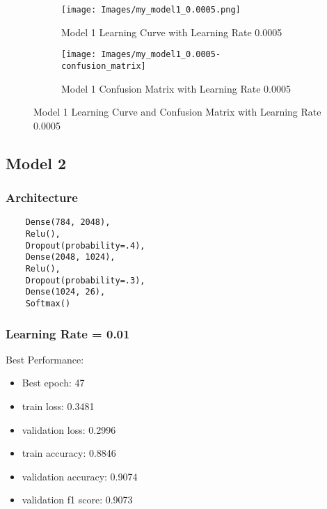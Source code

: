 \documentclass{article}
\begin{document}
\begin{figure}[h]
    \begin{subfigure}{0.5\textwidth}
        \texttt{[image: Images/my\_model1\_0.0005.png]} 
        \caption{Model 1 Learning Curve with Learning Rate 0.0005}
        \label{fig:model1_lr_0.0005}
    \end{subfigure}
    \begin{subfigure}{0.5\textwidth}
        \texttt{[image: Images/my\_model1\_0.0005-confusion\_matrix]} 
        \caption{Model 1 Confusion Matrix with Learning Rate 0.0005}
        \label{fig:model1_lr_0.0005_confusion_matrix}
    \end{subfigure}
    \caption{Model 1 Learning Curve and Confusion Matrix with Learning Rate 0.0005}
    \label{fig:model1_lr_0.0005_combined}
\end{figure}

\subsection{Model 2}
\subsubsection{Architecture}
\begin{verbatim}
    Dense(784, 2048),
    Relu(),
    Dropout(probability=.4),
    Dense(2048, 1024),
    Relu(),
    Dropout(probability=.3),
    Dense(1024, 26),
    Softmax()
\end{verbatim}

\subsubsection{Learning Rate = 0.01}
Best Performance:
\begin{itemize}
    \item Best epoch: 47
    \item train loss: 0.3481
    \item validation loss: 0.2996
    \item train accuracy: 0.8846
    \item validation accuracy: 0.9074
    \item validation f1 score: 0.9073
\end{itemize}
\end{document}
